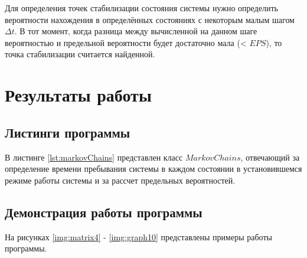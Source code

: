 \documentclass{bmstu}
\begin{document}
Для определения точек стабилизации состояния системы нужно определить вероятности нахождения в определённых состояниях с некоторым малым шагом $\Delta t$. В тот момент, когда разница между вычисленной на данном шаге вероятностью и предельной вероятности будет достаточно мала (< $EPS$), то точка стабилизации считается найденной.


\chapter{Результаты работы}

\section{Листинги программы}

В листинге \ref{lst:markovChains} представлен класс $MarkovChains$, отвечающий за определение времени пребывания системы в каждом состоянии в установившемся режиме работы системы и за рассчет предельных вероятностей.


\clearpage

\section{Демонстрация работы программы}

На рисунках \ref{img:matrix4} - \ref{img:graph10} представлены примеры работы программы.




\end{document}

